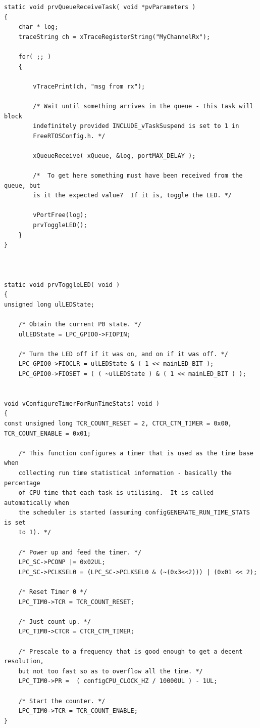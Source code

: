 \documentclass{article}
\begin{document}
\begin{lstlisting}[style=CStyle]
static void prvQueueReceiveTask( void *pvParameters )
{
	char * log;
	traceString ch = xTraceRegisterString("MyChannelRx");

	for( ;; )
	{

		vTracePrint(ch, "msg from rx");
		
		/* Wait until something arrives in the queue - this task will block
		indefinitely provided INCLUDE_vTaskSuspend is set to 1 in
		FreeRTOSConfig.h. */
		
		xQueueReceive( xQueue, &log, portMAX_DELAY );

		/*  To get here something must have been received from the queue, but
		is it the expected value?  If it is, toggle the LED. */
		
		vPortFree(log);
		prvToggleLED();
	}
}



static void prvToggleLED( void )
{
unsigned long ulLEDState;

	/* Obtain the current P0 state. */
	ulLEDState = LPC_GPIO0->FIOPIN;

	/* Turn the LED off if it was on, and on if it was off. */
	LPC_GPIO0->FIOCLR = ulLEDState & ( 1 << mainLED_BIT );
	LPC_GPIO0->FIOSET = ( ( ~ulLEDState ) & ( 1 << mainLED_BIT ) );
	

void vConfigureTimerForRunTimeStats( void )
{
const unsigned long TCR_COUNT_RESET = 2, CTCR_CTM_TIMER = 0x00, TCR_COUNT_ENABLE = 0x01;

	/* This function configures a timer that is used as the time base when
	collecting run time statistical information - basically the percentage
	of CPU time that each task is utilising.  It is called automatically when
	the scheduler is started (assuming configGENERATE_RUN_TIME_STATS is set
	to 1). */

	/* Power up and feed the timer. */
	LPC_SC->PCONP |= 0x02UL;
	LPC_SC->PCLKSEL0 = (LPC_SC->PCLKSEL0 & (~(0x3<<2))) | (0x01 << 2);

	/* Reset Timer 0 */
	LPC_TIM0->TCR = TCR_COUNT_RESET;

	/* Just count up. */
	LPC_TIM0->CTCR = CTCR_CTM_TIMER;

	/* Prescale to a frequency that is good enough to get a decent resolution,
	but not too fast so as to overflow all the time. */
	LPC_TIM0->PR =  ( configCPU_CLOCK_HZ / 10000UL ) - 1UL;

	/* Start the counter. */
	LPC_TIM0->TCR = TCR_COUNT_ENABLE;
}
\end{lstlisting}
\end{document}
